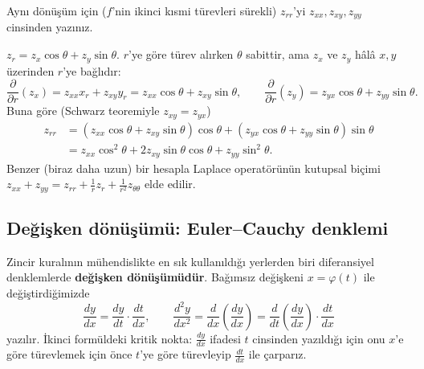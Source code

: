 \begin{soru}
Aynı dönüşüm için ($f$'nin ikinci kısmi türevleri sürekli) $z_{rr}$'yi $z_{xx},z_{xy},z_{yy}$ cinsinden yazınız.
\end{soru}
\begin{cevap}
$z_r=z_x\cos\theta+z_y\sin\theta$. $r$'ye göre türev alırken $\theta$ sabittir, ama $z_x$ ve $z_y$ hâlâ $x,y$ üzerinden
$r$'ye bağlıdır:
\[
\frac{\partial}{\partial r}(z_x)=z_{xx}x_r+z_{xy}y_r=z_{xx}\cos\theta+z_{xy}\sin\theta,\qquad
\frac{\partial}{\partial r}(z_y)=z_{yx}\cos\theta+z_{yy}\sin\theta .
\]
Buna göre (Schwarz teoremiyle $z_{xy}=z_{yx}$)
\begin{align*}
z_{rr}&=(z_{xx}\cos\theta+z_{xy}\sin\theta)\cos\theta+(z_{yx}\cos\theta+z_{yy}\sin\theta)\sin\theta\\
&=z_{xx}\cos^2\theta+2z_{xy}\sin\theta\cos\theta+z_{yy}\sin^2\theta .
\end{align*}
Benzer (biraz daha uzun) bir hesapla Laplace operatörünün kutupsal biçimi
$z_{xx}+z_{yy}=z_{rr}+\frac1r z_r+\frac{1}{r^2}z_{\theta\theta}$ elde edilir.
\end{cevap}

\subsection{Değişken dönüşümü: Euler--Cauchy denklemi}

Zincir kuralının mühendislikte en sık kullanıldığı yerlerden biri diferansiyel denklemlerde \textbf{değişken
dönüşümüdür}. Bağımsız değişkeni $x=\varphi(t)$ ile değiştirdiğimizde
\[
\frac{dy}{dx}=\frac{dy}{dt}\cdot\frac{dt}{dx},\qquad
\frac{d^2y}{dx^2}=\frac{d}{dx}\left(\frac{dy}{dx}\right)=\frac{d}{dt}\left(\frac{dy}{dx}\right)\cdot\frac{dt}{dx}
\]
yazılır. İkinci formüldeki kritik nokta: $\frac{dy}{dx}$ ifadesi $t$ cinsinden yazıldığı için onu $x$'e göre türevlemek
için önce $t$'ye göre türevleyip $\frac{dt}{dx}$ ile çarparız.

